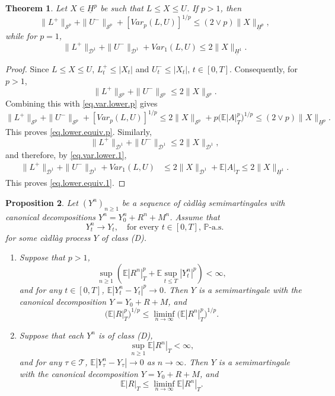 \documentclass[11pt,a4paper,reqno]{amsart}
\newtheorem{theorem}{\bf Theorem}[section]
\newtheorem{proposition}[theorem]{\bf Proposition}
\theoremstyle{definition}
\numberwithin{equation}{section}
\begin{document}
\begin{theorem}
Let $X\in \underline{H}^p$ be such that $L\le X\le U$. If  $p>1$, then 
\begin{equation}
\label{eq.lower.equiv.p}
\|L^+\|_{\mathcal S^p}+\|U^-\|_{\mathcal S^p}+[Var_p(L,U)]^{1/p}\leq(2\vee p)\|X\|_{\underline H^p},
\end{equation}
while  for $p=1$,
\begin{equation}\label{eq.lower.equiv.1}
\|L^+\|_{\mathcal D^1}
+\|U^-\|_{\mathcal D^1}
+Var_1(L,U)
\leq
2\|X\|_{\underline H^1}.
\end{equation}
\end{theorem}
\begin{proof}
Since $L\leq X\leq U$, $L^+_t\leq |X_t|$ and  $U^-_t\leq |X_t|$, $t\in[0,T]$.
Consequently, for $p>1$,
\[
\|L^+\|_{\mathcal S^p}
+
\|U^-\|_{\mathcal S^p}
\leq
2\|X\|_{\mathcal S^p}.
\]
Combining this with \eqref{eq.var.lower.p} gives
\[
\|L^+\|_{\mathcal S^p}
+\|U^-\|_{\mathcal S^p}
+[Var_p(L,U)]^{1/p}\leq
2\|X\|_{\mathcal S^p}+p\big(\mathbb E|A|_T^p\big)^{1/p}\leq
(2\vee p)\|X\|_{\underline H^p}.
\]
This proves \eqref{eq.lower.equiv.p}.
Similarly,
\[
\|L^+\|_{\mathcal D^1}
+
\|U^-\|_{\mathcal D^1}
\leq
2\|X\|_{\mathcal D^1},
\]
and therefore, by \eqref{eq.var.lower.1},
\[
\begin{split}
\|L^+\|_{\mathcal D^1}
+\|U^-\|_{\mathcal D^1}
+Var_1(L,U)
&\leq
2\|X\|_{\mathcal D^1}
+\mathbb E|A|_T\leq
2\|X\|_{\underline H^1}.
\end{split}
\]
This proves \eqref{eq.lower.equiv.1}. 
\end{proof}

\begin{proposition}
\label{lem:lsc-Hp}
Let $(Y^n)_{n\geq1}$ be a sequence of c\`adl\`ag
semimartingales with  canonical decompositions $Y^n=Y^n_0+R^n+M^n$.
Assume that 
\[
Y^n_t\to Y_t,\quad \text{for every } t\in [0,T],\, \mathbb P\text{-a.s.}
\]
for some  c\`adl\`ag process $Y$ of class (D).
\begin{enumerate}
\item[(i)] Suppose that $p>1$,  
\[
\sup_{n\geq1}\left(\mathbb E|R^n|_T^p+\mathbb E\sup_{t\le T}|Y^n_t|^p\right)<\infty,
\]
and for any $t\in [0,T]$, $\mathbb E|Y^n_t-Y_t|^p\to0$. 
Then $Y$ is a semimartingale with the canonical decomposition $Y=Y_0+R+M$,
and 
\[
\big(\mathbb E|R|_T^p\big)^{1/p}
\leq
\liminf_{n\to\infty}
\big(\mathbb E|R^n|_T^p\big)^{1/p}.
\]
\item[(ii)] Suppose that  each $Y^n$ is of class (D),
\[
\sup_{n\geq1}\mathbb E|R^n|_T<\infty,
\]
and for any $\tau\in\mathcal T$, $\mathbb E|Y^n_\tau-Y_\tau|\to 0$ as $n\to \infty$.
Then $Y$ is a semimartingale with the canonical decomposition $Y=Y_0+R+M$, and 
\[
\mathbb E|R|_T
\leq
\liminf_{n\to\infty}
\mathbb E|R^n|_T.
\]
\end{enumerate}
\end{proposition}
\end{document}
